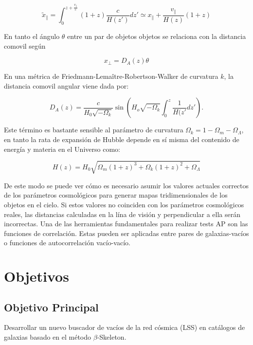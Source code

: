 \documentclass[preprint]{aastex62}
\begin{document}
  \begin{equation}
    \tilde{x}_{\parallel} = \int _0 ^{z + \frac{v_\parallel}{c}}(1+z) \frac{c}{H(z')}dz'
    \simeq x_\parallel + \frac{v_\parallel}{H(z)}(1+z)
  \end{equation}

  En tanto el ángulo $\theta$  entre un par de objetos objetos se relaciona con la distancia comovil según

  \begin{equation}
    x_{\perp} = D_A(z)\theta
  \end{equation}
  
  En una métrica de  Friedmann-Lema\^itre-Robertson-Walker de curvatura $k$, la distancia
  comovil angular viene dada por:
  
  \begin{equation}
    D_A(z) = \frac{c}{H_0\sqrt{-\Omega_k}} \sin \left( H_o\sqrt{-\Omega_k}
    \int_0^z \frac{1}{H(z'} dz' \right).
  \end{equation}
  
  Este término es bastante sensible al parámetro de curvatura
  $\Omega_k = 1 - \Omega_m - \Omega_\Lambda$, en tanto la rata de expansión de Hubble
  depende en sí misma del contenido de energía y materia en el Universo como:

  \begin{equation}
    H(z) = H_0 \sqrt{ \Omega_m(1+z)^3 + \Omega_k(1+z)^2+\Omega_\Lambda}
  \end{equation}

  De este modo se puede ver cómo es necesario asumir los valores actuales correctos de los
  parámetros cosmológicos para generar mapas tridimensionales de los objetos en el cielo. Si
  estos valores no coinciden con los parámetros
  cosmológicos reales, las distancias calculadas  en la lína de visión y perpendicular a ella serán
  incorrectas. Una de las herramientas fundamentales para realizar tests AP son las funciones
  de correlación. Estas pueden ser aplicadas entre pares de galaxias-vacíos o funciones de
  autocorrelación vacío-vacío.
  

  
  \section{Objetivos}

  \subsection{Objetivo Principal}
  Desarrollar un nuevo buscador de vacíos de la red cósmica (LSS) en catálogos de galaxias
  basado en el método $\beta$-Skeleton.
  
\end{document}

